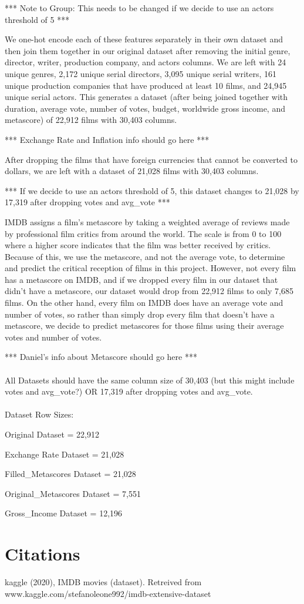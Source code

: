 \documentclass{article}
\begin{document}
*** Note to Group: This needs to be changed if we decide to use an actors threshold of 5 ***

We one-hot encode each of these features separately in their own dataset and then join them together in our original dataset after removing the initial genre, director, writer, production company, and actors columns. We are left with 24 unique genres, 2,172 unique serial directors, 3,095 unique serial writers, 161 unique production companies that have produced at least 10 films, and 24,945 unique serial actors. This generates a dataset (after being joined together with duration, average vote, number of votes, budget, worldwide gross income, and metascore) of 22,912 films with 30,403 columns.

*** Exchange Rate and Inflation info should go here ***

After dropping the films that have foreign currencies that cannot be converted to dollars, we are left with a dataset of 21,028 films with 30,403 columns.

*** If we decide to use an actors threshold of 5, this dataset changes to 21,028 by 17,319 after dropping votes and avg\_vote ***

IMDB assigns a film's metascore by taking a weighted average of reviews made by professional film critics from around the world. The scale is from 0 to 100 where a higher score indicates that the film was better received by critics. Because of this, we use the metascore, and not the average vote, to determine and predict the critical reception of films in this project. However, not every film has a metascore on IMDB, and if we dropped every film in our dataset that didn't have a metascore, our dataset would drop from 22,912 films to only 7,685 films. On the other hand, every film on IMDB does have an average vote and number of votes, so rather than simply drop every film that doesn't have a metascore, we decide to predict metascores for those films using their average votes and number of votes.

*** Daniel's info about Metascore should go here ***
\\
\\
All Datasets should have the same column size of 30,403 (but this might include votes and avg\_vote?) OR 17,319 after dropping votes and avg\_vote.
\\
\\
Dataset Row Sizes:

Original Dataset = 22,912

Exchange Rate Dataset = 21,028

Filled\_Metascores Dataset = 21,028

Original\_Metascores Dataset = 7,551

Gross\_Income Dataset = 12,196




\section*{Citations}
kaggle (2020), IMDB movies (dataset). Retreived from www.kaggle.com/stefanoleone992/imdb-extensive-dataset
\end{document}
